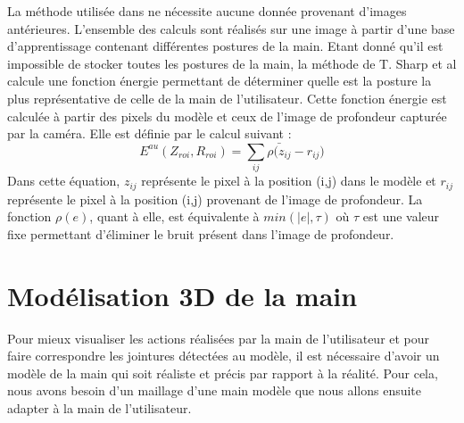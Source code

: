 La méthode utilisée dans \cite{export:238453} ne nécessite aucune donnée provenant d'images antérieures. L'ensemble
des calculs sont réalisés sur une image à partir d'une base d'apprentissage contenant différentes postures de la
main. Etant donné qu'il est impossible de stocker toutes les postures de la main, la méthode de T. Sharp et al \cite{export:238453}
calcule une fonction énergie permettant de déterminer quelle est la posture la plus représentative de celle de la main
de l'utilisateur. Cette fonction énergie est calculée à partir des pixels du modèle et ceux de l'image de profondeur
capturée par la caméra. Elle est définie par le calcul suivant :
\begin{equation}
 E^{au}(Z_{roi}, R_{roi}) = \sum_{ij} \bar{\rho(z_{ij}} - r_{ij})
\end{equation}
Dans cette équation, $z_{ij}$ représente le pixel à la position (i,j) dans le modèle et $r_{ij}$ représente le pixel à la position (i,j)
provenant de l'image de profondeur. La fonction $\rho(e)$, quant à elle, est équivalente à $min(|e|,\tau)$ où $\tau$ est une valeur fixe permettant d'éliminer le bruit présent dans l'image de profondeur.

\section{Modélisation 3D de la main}
Pour mieux visualiser les actions réalisées par la main de l'utilisateur et pour faire correspondre les jointures détectées au modèle, il est nécessaire d'avoir
un modèle de la main qui soit réaliste et précis par rapport à la réalité. Pour cela, nous avons besoin d'un
maillage d'une main modèle que nous allons ensuite adapter à la main de l'utilisateur.\\

